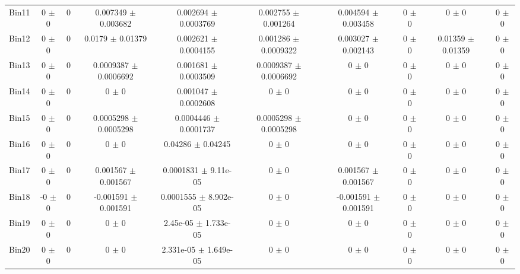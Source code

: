 \begin{tabular}{@{\extracolsep{4pt}}lccccccccc@{}}
     Bin11 & 0 $\pm$ 0 & 0 & 0.007349 $\pm$ 0.003682 & 0.002694 $\pm$ 0.0003769 & 0.002755 $\pm$ 0.001264 & 0.004594 $\pm$ 0.003458 & 0 $\pm$ 0 & 0 $\pm$ 0 & 0 $\pm$ 0 \\ 
     Bin12 & 0 $\pm$ 0 & 0 & 0.0179 $\pm$ 0.01379 & 0.002621 $\pm$ 0.0004155 & 0.001286 $\pm$ 0.0009322 & 0.003027 $\pm$ 0.002143 & 0 $\pm$ 0 & 0.01359 $\pm$ 0.01359 & 0 $\pm$ 0 \\ 
     Bin13 & 0 $\pm$ 0 & 0 & 0.0009387 $\pm$ 0.0006692 & 0.001681 $\pm$ 0.0003509 & 0.0009387 $\pm$ 0.0006692 & 0 $\pm$ 0 & 0 $\pm$ 0 & 0 $\pm$ 0 & 0 $\pm$ 0 \\ 
     Bin14 & 0 $\pm$ 0 & 0 & 0 $\pm$ 0 & 0.001047 $\pm$ 0.0002608 & 0 $\pm$ 0 & 0 $\pm$ 0 & 0 $\pm$ 0 & 0 $\pm$ 0 & 0 $\pm$ 0 \\ 
     Bin15 & 0 $\pm$ 0 & 0 & 0.0005298 $\pm$ 0.0005298 & 0.0004446 $\pm$ 0.0001737 & 0.0005298 $\pm$ 0.0005298 & 0 $\pm$ 0 & 0 $\pm$ 0 & 0 $\pm$ 0 & 0 $\pm$ 0 \\ 
     Bin16 & 0 $\pm$ 0 & 0 & 0 $\pm$ 0 & 0.04286 $\pm$ 0.04245 & 0 $\pm$ 0 & 0 $\pm$ 0 & 0 $\pm$ 0 & 0 $\pm$ 0 & 0 $\pm$ 0 \\ 
     Bin17 & 0 $\pm$ 0 & 0 & 0.001567 $\pm$ 0.001567 & 0.0001831 $\pm$ 9.11e-05 & 0 $\pm$ 0 & 0.001567 $\pm$ 0.001567 & 0 $\pm$ 0 & 0 $\pm$ 0 & 0 $\pm$ 0 \\ 
     Bin18 & -0 $\pm$ 0 & 0 & -0.001591 $\pm$ 0.001591 & 0.0001555 $\pm$ 8.902e-05 & 0 $\pm$ 0 & -0.001591 $\pm$ 0.001591 & 0 $\pm$ 0 & 0 $\pm$ 0 & 0 $\pm$ 0 \\ 
     Bin19 & 0 $\pm$ 0 & 0 & 0 $\pm$ 0 & 2.45e-05 $\pm$ 1.733e-05 & 0 $\pm$ 0 & 0 $\pm$ 0 & 0 $\pm$ 0 & 0 $\pm$ 0 & 0 $\pm$ 0 \\ 
     Bin20 & 0 $\pm$ 0 & 0 & 0 $\pm$ 0 & 2.331e-05 $\pm$ 1.649e-05 & 0 $\pm$ 0 & 0 $\pm$ 0 & 0 $\pm$ 0 & 0 $\pm$ 0 & 0 $\pm$ 0 \\ 
\hline\hline
  \end{tabular}
